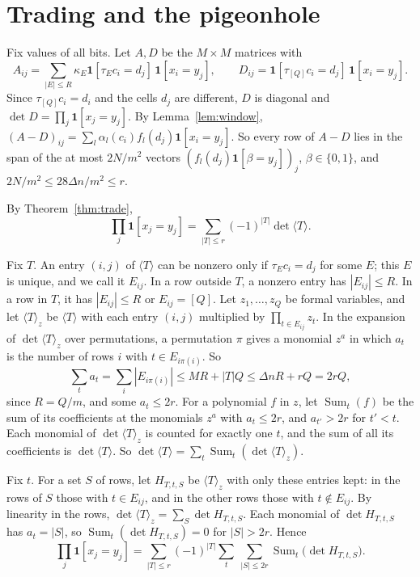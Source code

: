 \documentclass[11pt]{article}
\numberwithin{equation}{section}
\theoremstyle{remark}
\newcommand{\bits}{\{0,1\}}
\begin{document}
\section{Trading and the pigeonhole}\label{sec:trade}

Fix values of all bits. Let $A,D$ be the $M\times M$ matrices with
\[
A_{ij}=\sum_{|E|\le R}\kappa_E\mathbf 1[\tau_Ec_i=d_j]\,\mathbf 1[x_i=y_j],\qquad D_{ij}=\mathbf 1[\tau_{[Q]}c_i=d_j]\,\mathbf 1[x_i=y_j].
\]
Since $\tau_{[Q]}c_i=d_i$ and the cells $d_j$ are different, $D$ is diagonal and $\det D=\prod_j\mathbf 1[x_j=y_j]$. By Lemma~\ref{lem:window}, $(A-D)_{ij}=\sum_l\alpha_l(c_i)f_l(d_j)\mathbf 1[x_i=y_j]$. So every row of $A-D$ lies in the span of the at most $2N/m^2$ vectors $(f_l(d_j)\mathbf 1[\beta=y_j])_j$, $\beta\in\bits$, and $2N/m^2\le28\Delta n/m^2\le r$.

By Theorem~\ref{thm:trade},
\begin{equation}\label{trade}
\prod_j\mathbf 1[x_j=y_j]=\sum_{|T|\le r}(-1)^{|T|}\det\langle T\rangle.
\end{equation}

Fix $T$. An entry $(i,j)$ of $\langle T\rangle$ can be nonzero only if $\tau_Ec_i=d_j$ for some $E$; this $E$ is unique, and we call it $E_{ij}$. In a row outside $T$, a nonzero entry has $|E_{ij}|\le R$. In a row in $T$, it has $|E_{ij}|\le R$ or $E_{ij}=[Q]$. Let $z_1,\dots,z_Q$ be formal variables, and let $\langle T\rangle_z$ be $\langle T\rangle$ with each entry $(i,j)$ multiplied by $\prod_{t\in E_{ij}}z_t$. In the expansion of $\det\langle T\rangle_z$ over permutations, a permutation $\pi$ gives a monomial $z^a$ in which $a_t$ is the number of rows $i$ with $t\in E_{i\pi(i)}$. So
\[
\sum_ta_t=\sum_i|E_{i\pi(i)}|\le MR+|T|Q\le\Delta nR+rQ=2rQ,
\]
since $R=Q/m$, and some $a_t\le2r$. For a polynomial $f$ in $z$, let $\operatorname{Sum}_t(f)$ be the sum of its coefficients at the monomials $z^a$ with $a_t\le2r$, and $a_{t'}>2r$ for $t'<t$. Each monomial of $\det\langle T\rangle_z$ is counted for exactly one $t$, and the sum of all its coefficients is $\det\langle T\rangle$. So $\det\langle T\rangle=\sum_t\operatorname{Sum}_t(\det\langle T\rangle_z)$.

Fix $t$. For a set $S$ of rows, let $H_{T,t,S}$ be $\langle T\rangle_z$ with only these entries kept: in the rows of $S$ those with $t\in E_{ij}$, and in the other rows those with $t\notin E_{ij}$. By linearity in the rows, $\det\langle T\rangle_z=\sum_S\det H_{T,t,S}$. Each monomial of $\det H_{T,t,S}$ has $a_t=|S|$, so $\operatorname{Sum}_t(\det H_{T,t,S})=0$ for $|S|>2r$. Hence
\begin{equation}\label{sum}
\prod_j\mathbf 1[x_j=y_j]=\sum_{|T|\le r}(-1)^{|T|}\sum_t\ \sum_{|S|\le2r}\operatorname{Sum}_t\bigl(\det H_{T,t,S}\bigr).
\end{equation}
\end{document}
